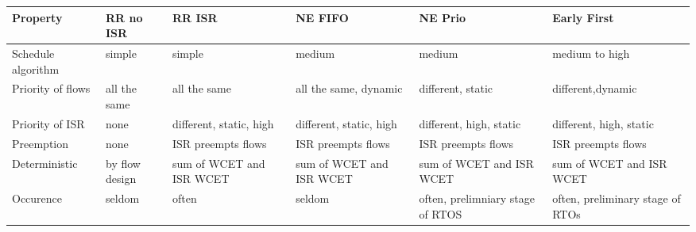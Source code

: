 \clearpage
\begin{sidewaystable}
  \begin{tabularx}{\textwidth}{l X X X X X}
    \hline
    Property           & RR no ISR      & RR ISR                   & NE FIFO                  & NE Prio                          & Early First                      \\\hline
    Schedule algorithm & simple         & simple                   & medium                   & medium                           & medium to high                   \\
    Priority of flows  & all the same   & all the same             & all the same, dynamic    & different, static                & different,dynamic                \\
    Priority of ISR    & none           & different, static, high  & different, static, high  & different, high, static          & different, high, static          \\
    Preemption         & none           & ISR preempts flows       & ISR preempts flows       & ISR preempts flows               & ISR preempts flows               \\
    Deterministic      & by flow design & sum of WCET and ISR WCET & sum of WCET and ISR WCET & sum of WCET and ISR WCET         & sum of WCET and ISR WCET         \\
    Occurence          & seldom         & often                    & seldom                   & often, prelimniary stage of RTOS & often, preliminary stage of RTOs \\\hline
  \end{tabularx}
\end{sidewaystable}